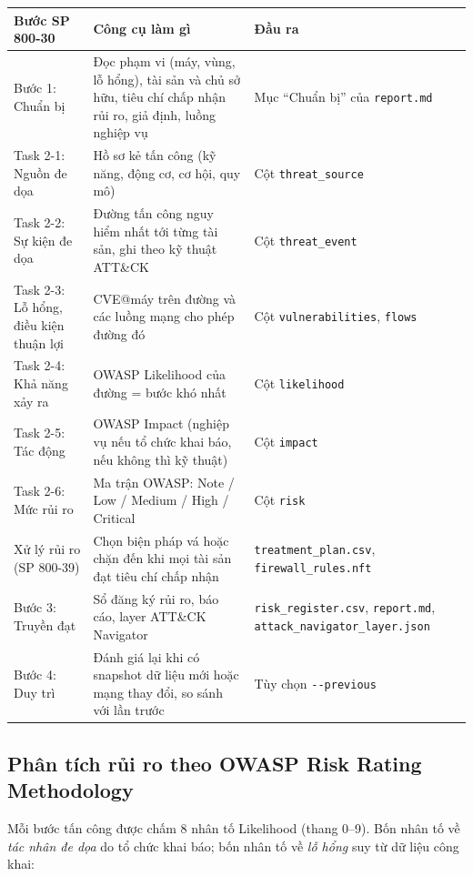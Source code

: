 \documentclass[11pt,a4paper]{article}
\begin{document}
\begin{center}
\small
\begin{tabular}{@{}Y{4.0cm}Y{7.6cm}Y{4.4cm}@{}}
\toprule
\textbf{Bước SP 800-30} & \textbf{Công cụ làm gì} & \textbf{Đầu ra} \\
\midrule
Bước 1: Chuẩn bị & Đọc phạm vi (máy, vùng, lỗ hổng), tài sản và chủ sở hữu, tiêu chí chấp nhận rủi ro, giả định, luồng nghiệp vụ & Mục ``Chuẩn bị'' của \texttt{report.md} \\
Task 2-1: Nguồn đe dọa & Hồ sơ kẻ tấn công (kỹ năng, động cơ, cơ hội, quy mô) & Cột \texttt{threat\_source} \\
Task 2-2: Sự kiện đe dọa & Đường tấn công nguy hiểm nhất tới từng tài sản, ghi theo kỹ thuật ATT\&CK & Cột \texttt{threat\_event} \\
Task 2-3: Lỗ hổng, điều kiện thuận lợi & CVE@máy trên đường và các luồng mạng cho phép đường đó & Cột \texttt{vulnerabilities}, \texttt{flows} \\
Task 2-4: Khả năng xảy ra & OWASP Likelihood của đường = bước khó nhất & Cột \texttt{likelihood} \\
Task 2-5: Tác động & OWASP Impact (nghiệp vụ nếu tổ chức khai báo, nếu không thì kỹ thuật) & Cột \texttt{impact} \\
Task 2-6: Mức rủi ro & Ma trận OWASP: Note / Low / Medium / High / Critical & Cột \texttt{risk} \\
Xử lý rủi ro (SP 800-39) & Chọn biện pháp vá hoặc chặn đến khi mọi tài sản đạt tiêu chí chấp nhận & \texttt{treatment\_plan.csv}, \texttt{firewall\_rules.nft} \\
Bước 3: Truyền đạt & Sổ đăng ký rủi ro, báo cáo, layer ATT\&CK Navigator & \texttt{risk\_register.csv}, \texttt{report.md}, \texttt{attack\_navigator\_layer.json} \\
Bước 4: Duy trì & Đánh giá lại khi có snapshot dữ liệu mới hoặc mạng thay đổi, so sánh với lần trước & Tùy chọn \texttt{-{}-previous} \\
\bottomrule
\end{tabular}
\end{center}

\subsection{Phân tích rủi ro theo OWASP Risk Rating Methodology}

Mỗi bước tấn công được chấm 8 nhân tố Likelihood (thang 0--9). Bốn nhân tố về \emph{tác nhân đe dọa} do tổ chức khai báo; bốn nhân tố về \emph{lỗ hổng} suy từ dữ liệu công khai:
\end{document}
